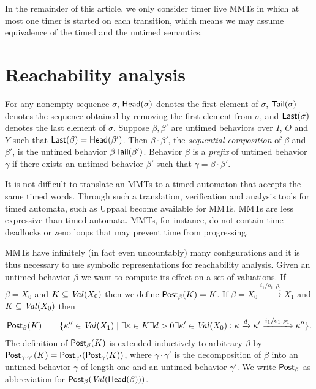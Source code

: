 In the remainder of this article, we only consider timer live MMTs in which at most one timer is started on each transition,
which means we may assume equivalence of the timed and the untimed semantics.

\section{Reachability analysis}
For any nonempty sequence $\sigma$, $\mathsf{Head}({\sigma})$ denotes the first element of $\sigma$, $\mathsf{Tail}({\sigma})$ denotes the sequence obtained by removing the first element from $\sigma$, and $\mathsf{Last}({\sigma})$ denotes the last element of $\sigma$.
Suppose $\beta, \beta'$ are untimed behaviors over $I$, $O$ and $Y$ such that $\mathsf{Last}({\beta}) = \mathsf{Head}({\beta'})$.
Then $\beta \cdot \beta'$, the \emph{sequential composition} of $\beta$ and $\beta'$, is the untimed behavior $\beta \mathsf{Tail}({\beta'})$.
Behavior $\beta$ is a \emph{prefix} of untimed behavior $\gamma$ if there exists an untimed behavior $\beta'$ such that $\gamma = \beta \cdot \beta'$.

\iflong
It is not difficult to translate an MMTs to a timed automaton \cite{AD94,BengtssonY03} that accepts the same timed words.
Through such a translation, verification and analysis tools for timed automata, such as Uppaal \cite{Uppaal4.0}
become available for MMTs.
MMTs are less expressive than timed automata. MMTs, for instance, do not contain time deadlocks or zeno loops that
may prevent time from progressing.
\fi

MMTs have infinitely (in fact even uncountably) many configurations and it is thus necessary to use symbolic representations
for reachability analysis. Given an untimed behavior $\beta$ we want to compute its effect on a set of valuations. 
If $\beta =X_0$ and $K \subseteq\mathit{Val}({X_0})$ then we define $\mathsf{Post}_{\beta}(K) = K$.
If $\beta = X_0 \xrightarrow{i_1/o_1, \rho_1} X_1$ and
$K \subseteq\mathit{Val}({X_0})$ then
\begin{eqnarray*}
\mathsf{Post}_{\beta}(K) & = & \{ \kappa'' \in\mathit{Val}({X_1}) \mid \exists \kappa \in K \exists d >0 \exists \kappa' \in\mathit{Val}({X_0}) :
 \kappa \xrightarrow{d} \kappa' \xrightarrow{i_1/o_1, \rho_1} \kappa'' \}.
\end{eqnarray*}
The definition of $\mathsf{Post}_{\beta}(K)$ is extended inductively to arbitrary $\beta$ by 
$\mathsf{Post}_{\gamma \cdot \gamma'}(K) = \mathsf{Post}_{\gamma'} (\mathsf{Post}_{\gamma}(K))$, where $\gamma \cdot \gamma'$ is the decomposition of
$\beta$ into an untimed behavior $\gamma$ of length one and an untimed behavior $\gamma'$.
We write $\mathsf{Post}_{\beta}$ as abbreviation for $\mathsf{Post}_{\beta}(\mathit{Val}({\mathsf{Head}({\beta})}))$.

